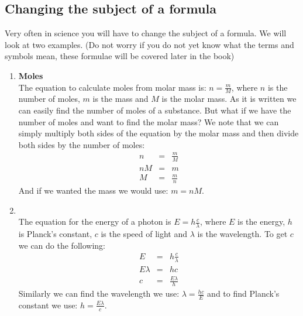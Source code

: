 \begin{enumerate}[label=\textbf{\arabic*}.]
\subsection*{Changing the subject of a formula}
Very often in science you will have to change the subject of a formula. We will look at two examples. (Do not worry if you do not yet know what the terms and symbols mean, these formulae will be covered later in the book)
\begin{enumerate}[label=\textbf{\arabic*}.]
 \item \textbf{Moles}\\
The equation to calculate moles from molar mass is: $n = \frac{m}{M}$, where $n$ is the number of moles, $m$ is the mass and $M$ is the molar mass. As it is written we can easily find the number of moles of a substance. But what if we have the number of moles and want to find the molar mass? We note that we can simply multiply both sides of the equation by the molar mass and then divide both sides by the number of moles:
\begin{eqnarray*}
 n & = & \frac{m}{M} \\
nM & = & m \\
M & = & \frac{m}{n}
\end{eqnarray*}
And if we wanted the mass we would use: $m = nM$.
\item {}\\
The equation for the energy of a photon is $E = h\frac{c}{\lambda}$, where $E$ is the energy, $h$ is Planck's constant, $c$ is the speed of light and $\lambda$ is the wavelength. To get $c$ we can do the following:
\begin{eqnarray*}
 E & = & h\frac{c}{\lambda} \\
E \lambda & = & hc \\
c & = & \frac{E \lambda}{h}
\end{eqnarray*}  
Similarly we can find the wavelength we use: $\lambda = \frac{hc}{E}$ and to find Planck's constant we use: $h =  \frac{E \lambda}{c}$.
\end{enumerate}

\end{enumerate}

